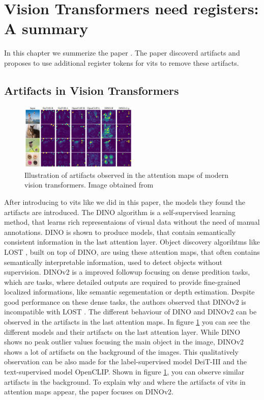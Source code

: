 \documentclass[conference]{IEEEtran}
\begin{document}
  \section{Vision Transformers need registers: A summary}
  \label{sec:registers}

  In this chapter we summerize the paper \cite{registers}. The paper discoverd artifacts and proposes to use additional register tokens for \acp{vit} to remove these artifacts.

  \subsection{Artifacts in Vision Transformers}
  \label{sec:registers:artifacts}

  \begin{figure}
    \centering
    \includegraphics[width=0.5\textwidth]{figures/vits-artifacts.png}
    \caption{Illustration of artifacts observed in the attention maps of modern vision transformers. Image obtained from \cite{registers}}
    \label{fig:artifacts-observations}
  \end{figure}


  After introducing to \acp{vit} like we did in this paper, the models they found the artifacts are introduced. The \mbox{DINO} algorithm is a self-supervised learning method, that learns rich representaions of visual data without the need of manual annotations. \cite{dino} \mbox{DINO} is shown to produce models, that contain semantically consistent information in the last attention layer. Object discovery algorihtms like \mbox{LOST} \cite{lost}, built on top of \mbox{DINO}, are using these attention maps, that often contains semantically interpretable information, used to detect objects without supervision. \mbox{DINOv2} \cite{dinov2} is a improved followup focusing on dense predition tasks, which are tasks, where detailed outputs are required to provide fine-grained localized informations, like semantic segementation or depth estimation. Despite good performance on these dense tasks, the authors observed that \mbox{DINOv2} is incompatible with \mbox{LOST} \cite{registers}. The different behaviour of \mbox{DINO} and \mbox{DINOv2} can be observed in the artifacts in the last attention maps. In figure \ref{fig:artifacts-observations} you can see the different models and their artifacts on the last attention layer.
  While \mbox{DINO} shows no peak outlier values focusing the main object in the image, \mbox{DINOv2} shows a lot of artifacts on the background of the images. This qualitatively observation can be also made for the label-supervised model \mbox{DeiT-III} and the text-supervised model \mbox{OpenCLIP}. Shown in figure \ref{fig:artifacts-observations}, you can observe similar artifacts in the background.
  To explain why and where the artifacts of \acp{vit} in attention maps appear, the paper focuses on \mbox{DINOv2}. 
\end{document}
